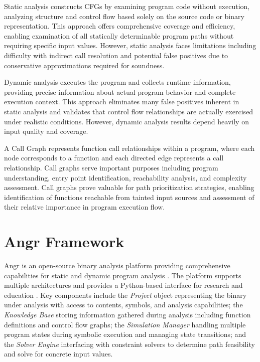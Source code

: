 Static analysis constructs CFGs by examining program code without execution, analyzing structure and control flow based solely on the source code or binary representation. This approach offers comprehensive coverage and efficiency, enabling examination of all statically determinable program paths without requiring specific input values. However, static analysis faces limitations including difficulty with indirect call resolution and potential false positives due to conservative approximations required for soundness.

Dynamic analysis executes the program and collects runtime information, providing precise information about actual program behavior and complete execution context. This approach eliminates many false positives inherent in static analysis and validates that control flow relationships are actually exercised under realistic conditions. However, dynamic analysis results depend heavily on input quality and coverage.

A Call Graph represents function call relationships within a program, where each node corresponds to a function and each directed edge represents a call relationship. Call graphs serve important purposes including program understanding, entry point identification, reachability analysis, and complexity assessment. Call graphs prove valuable for path prioritization strategies, enabling identification of functions reachable from tainted input sources and assessment of their relative importance in program execution flow.

\section{Angr Framework}

Angr is an open-source binary analysis platform providing comprehensive capabilities for static and dynamic program analysis \cite{shoshitaishvili_sok_2016}. The platform supports multiple architectures and provides a Python-based interface for research and education \cite{springer_teaching_2018}. Key components include the \textit{Project} object representing the binary under analysis with access to contents, symbols, and analysis capabilities; the \textit{Knowledge Base} storing information gathered during analysis including function definitions and control flow graphs; the \textit{Simulation Manager} handling multiple program states during symbolic execution and managing state transitions; and the \textit{Solver Engine} interfacing with constraint solvers to determine path feasibility and solve for concrete input values.

